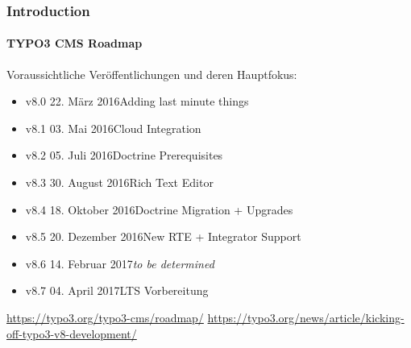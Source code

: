 \begin{frame}[fragile]
	\frametitle{Introduction}
	\framesubtitle{TYPO3 CMS Roadmap}

	Voraussichtliche Veröffentlichungen und deren Hauptfokus:

	\begin{itemize}

		\item v8.0 \tabto{1.0cm}22. März 2016\tabto{4.2cm}Adding last minute things
		\item v8.1 \tabto{1.0cm}03. Mai 2016\tabto{4.2cm}Cloud Integration
		\item v8.2 \tabto{1.0cm}05. Juli 2016\tabto{4.2cm}Doctrine Prerequisites
		\item v8.3 \tabto{1.0cm}30. August 2016\tabto{4.2cm}Rich Text Editor
		\item v8.4 \tabto{1.0cm}18. Oktober 2016\tabto{4.2cm}Doctrine Migration + Upgrades
		\item
			\begingroup
				\color{typo3orange}
					v8.5 \tabto{1.0cm}20. Dezember 2016\tabto{4.2cm}New RTE + Integrator Support
			\endgroup
		\item v8.6 \tabto{1.0cm}14. Februar 2017\tabto{4.2cm}\textit{to be determined}
		\item v8.7 \tabto{1.0cm}04. April 2017\tabto{4.2cm}LTS Vorbereitung

	\end{itemize}

	\smaller
		\url{https://typo3.org/typo3-cms/roadmap/}\newline
		\url{https://typo3.org/news/article/kicking-off-typo3-v8-development/}
	\normalsize

\end{frame}

